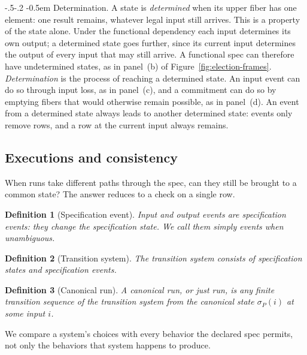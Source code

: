 \documentclass[sigconf]{cidr-2027}
\makeatletter
\newtheorem{definition}{Definition}
\theoremstyle{remark}
\renewcommand\paragraph{\@startsection{paragraph}{4}{\z@}%
  {-.5\baselineskip \@plus -2\p@ \@minus -.2\p@}%
  {-0.5em}%
  {\normalfont\bfseries}}
\newcommand{\commitment}{commitment\xspace}
\makeatother
\begin{document}
\paragraph{Determination.}
\color{blue!70!black}A state is \emph{determined} when its upper fiber has one element: one result
remains, whatever legal input still arrives.  This is a property of the state
alone.  Under the functional dependency each input determines its own
output; a determined state goes further, since its current input determines
the output of every input that may still arrive.  A functional spec
can therefore have undetermined states, as in panel~(b) of
Figure~\ref{fig:election-frames}.  \emph{Determination} is the process of
reaching a determined state.  An input event can do so through input loss, as in panel~(c), and a
\commitment can do so by emptying fibers that would otherwise remain possible,
as in panel~(d).
An event from a determined state always leads to another determined state:
events only remove rows, and a row at the current input always remains.\color{black}

\subsection{Executions and consistency}
\label{sec:executions}

When runs take different paths through the spec, can they still be
brought to a common state?  The answer reduces to a check on a single row.

\begin{definition}[Specification event]
\label{def:specification-event}
Input and output events are \emph{specification events}: they change the
specification state.  We call them simply \emph{events} when unambiguous.
\end{definition}

\begin{definition}[Transition system]
\label{def:transition-system}
The \emph{transition system} consists of specification states and
specification events.
\end{definition}

\begin{definition}[Canonical run]
\label{def:run}
A \emph{canonical run}, or just \emph{run}, is any finite transition sequence of the transition system from the
canonical state $\sigma_P(i)$ at some input $i$.
\end{definition}

We compare a system's choices with every behavior the declared spec permits,
not only the behaviors that system happens to produce.
\end{document}
